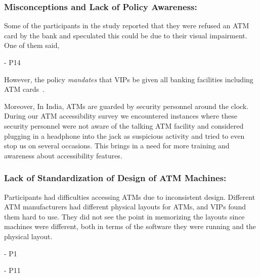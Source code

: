 \subsubsection*{\textbf{Misconceptions and Lack of Policy Awareness: }}
\label{sssec:misconceptions}
Some of the participants in the study reported that they were refused an ATM card by the bank and speculated this could be due to their visual impairment. One of them said,

\textcolor{quotegray}{ - P14}

However, the policy \textit{mandates} that VIPs be given all banking facilities including ATM cards~\cite{RBI2008}.  

Moreover, In India, ATMs are guarded by security personnel around the clock. During our ATM accessibility survey we encountered instances where these security personnel were not aware of the talking ATM facility and considered plugging in a headphone into the jack as suspicious activity and tried to even stop us on several occasions. This brings in a need for more training and awareness about accessibility features.

\subsubsection*{\textbf{Lack of Standardization of Design of ATM Machines: }}
\label{sssec:lackofstansardization}

Participants had difficulties accessing ATMs due to inconsistent design. Different ATM manufacturers had different physical layouts for ATMs, and VIPs found them hard to use. They did not see the point in memorizing the layouts since machines were different, both in terms of the software they were running and the physical layout.

\textcolor{quotegray}{ - P1}

\textcolor{quotegray}{ - P11}

